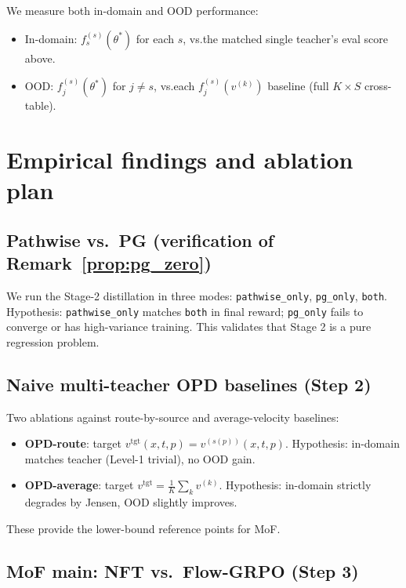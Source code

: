 \documentclass[11pt,a4paper]{article}
\theoremstyle{definition}
\begin{document}
We measure both in-domain and OOD performance:
\begin{itemize}[leftmargin=1.5em]
\item In-domain: $f_s^{(s)}(\theta^*)$ for each $s$, vs.\@ the matched
single teacher's eval score above.
\item OOD: $f_j^{(s)}(\theta^*)$ for $j\neq s$, vs.\@ each
$f_j^{(s)}(v^{(k)})$ baseline (full $K\!\times\!S$ cross-table).
\end{itemize}

\section{Empirical findings and ablation plan}
\label{sec:exp_findings}

\subsection{Pathwise vs.\ PG (verification of Remark~\ref{prop:pg_zero})}

We run the Stage-2 distillation in three modes:
\texttt{pathwise\_only}, \texttt{pg\_only}, \texttt{both}. Hypothesis:
\texttt{pathwise\_only} matches \texttt{both} in final reward; \texttt{pg\_only}
fails to converge or has high-variance training. This validates that
Stage 2 is a pure regression problem.

\subsection{Naive multi-teacher OPD baselines (Step 2)}

Two ablations against route-by-source and average-velocity baselines:
\begin{itemize}[leftmargin=1.5em]
\item \textbf{OPD-route}: target $v^{\mathrm{tgt}}(x,t,p) = v^{(s(p))}(x,t,p)$.
Hypothesis: in-domain matches teacher (Level-1 trivial), no OOD gain.
\item \textbf{OPD-average}: target
$v^{\mathrm{tgt}} = \tfrac{1}{K}\sum_k v^{(k)}$. Hypothesis: in-domain
strictly degrades by Jensen, OOD slightly improves.
\end{itemize}
These provide the lower-bound reference points for MoF.

\subsection{MoF main: NFT vs.\ Flow-GRPO (Step 3)}
\end{document}
